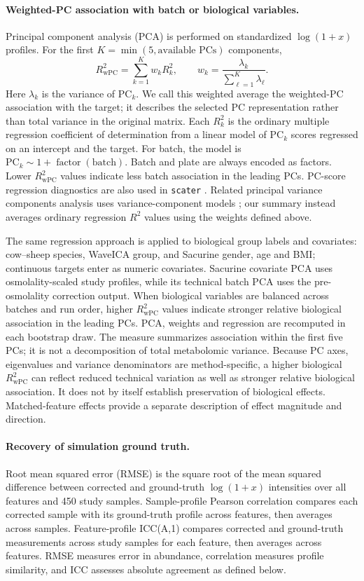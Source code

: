 \documentclass[namedate,webpdf,modern,large,nocrop]{oup-authoring-template}
\begin{document}
\paragraph{Weighted-PC association with batch or biological variables.} Principal component analysis (PCA) is performed on standardized \(\log(1+x)\) profiles. For the first \(K=\min(5,\text{available PCs})\) components,
\[
R_{\mathrm{wPC}}^2=\sum_{k=1}^{K}w_kR_k^2,\qquad w_k=\frac{\lambda_k}{\sum_{\ell=1}^{K}\lambda_\ell}.
\]
Here \(\lambda_k\) is the variance of \(\mathrm{PC}_k\). We call this weighted average the weighted-PC association with the target; it describes the selected PC representation rather than total variance in the original matrix. Each \(R_k^2\) is the ordinary multiple regression coefficient of determination from a linear model of \(\mathrm{PC}_k\) scores regressed on an intercept and the target. For batch, the model is \(\mathrm{PC}_k\sim1+\operatorname{factor}(\mathrm{batch})\). Batch and plate are always encoded as factors. Lower \(R_{\mathrm{wPC}}^2\) values indicate less batch association in the leading PCs. PC-score regression diagnostics are also used in \texttt{scater} \citep{McCarthy2017Scater}. Related principal variance components analysis uses variance-component models \citep{Li2009PVCA}; our summary instead averages ordinary regression \(R^2\) values using the weights defined above.

The same regression approach is applied to biological group labels and covariates: cow--sheep species, WaveICA group, and Sacurine gender, age and BMI; continuous targets enter as numeric covariates. Sacurine covariate PCA uses osmolality-scaled study profiles, while its technical batch PCA uses the pre-osmolality correction output. When biological variables are balanced across batches and run order, higher \(R_{\mathrm{wPC}}^2\) values indicate stronger relative biological association in the leading PCs. PCA, weights and regression are recomputed in each bootstrap draw. The measure summarizes association within the first five PCs; it is not a decomposition of total metabolomic variance. Because PC axes, eigenvalues and variance denominators are method-specific, a higher biological \(R_{\mathrm{wPC}}^2\) can reflect reduced technical variation as well as stronger relative biological association. It does not by itself establish preservation of biological effects. Matched-feature effects provide a separate description of effect magnitude and direction.

\paragraph{Recovery of simulation ground truth.} Root mean squared error (RMSE) is the square root of the mean squared difference between corrected and ground-truth \(\log(1+x)\) intensities over all features and 450 study samples. Sample-profile Pearson correlation compares each corrected sample with its ground-truth profile across features, then averages across samples. Feature-profile ICC(A,1) compares corrected and ground-truth measurements across study samples for each feature, then averages across features. RMSE measures error in abundance, correlation measures profile similarity, and ICC assesses absolute agreement as defined below.
\end{document}

